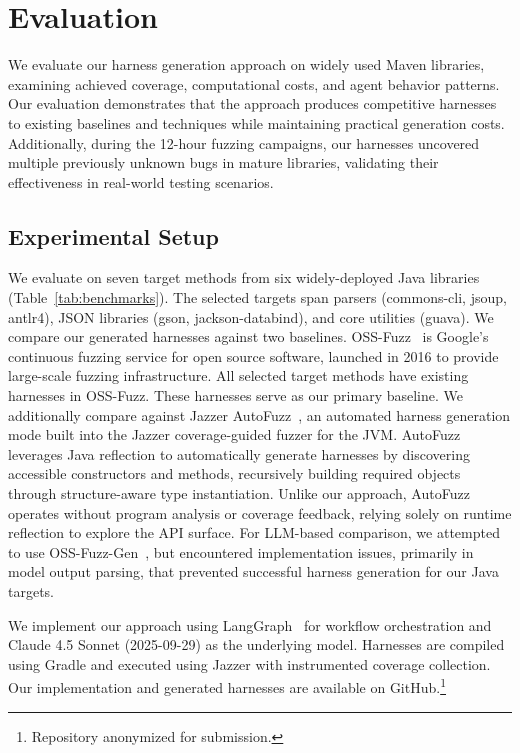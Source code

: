 \section{Evaluation}%
\label{sec:evaluation}

We evaluate our harness generation approach on widely used Maven libraries, examining achieved coverage, computational costs, and agent behavior patterns. Our evaluation demonstrates that the approach produces competitive harnesses to existing baselines and techniques while maintaining practical generation costs. Additionally, during the 12-hour fuzzing campaigns, our harnesses uncovered multiple previously unknown bugs in mature libraries, validating their effectiveness in real-world testing scenarios.

\subsection{Experimental Setup}%
\label{subsec:exp-setup}

We evaluate on seven target methods from six widely-deployed Java libraries (Table~\ref{tab:benchmarks}). The selected targets span parsers (commons-cli, jsoup, antlr4), JSON libraries (gson, jackson-databind), and core utilities (guava).
%
We compare our generated harnesses against two baselines. OSS-Fuzz~\cite{ossfuzz2017} is Google's continuous fuzzing service for open source software, launched in 2016 to provide large-scale fuzzing infrastructure. All selected target methods have existing harnesses in OSS-Fuzz. These harnesses serve as our primary baseline.
%
We additionally compare against Jazzer AutoFuzz~\cite{jazzer}, an automated harness generation mode built into the Jazzer coverage-guided fuzzer for the JVM. AutoFuzz leverages Java reflection to automatically generate harnesses by discovering accessible constructors and methods, recursively building required objects through structure-aware type instantiation. Unlike our approach, AutoFuzz operates without program analysis or coverage feedback, relying solely on runtime reflection to explore the API surface.
%
For LLM-based comparison, we attempted to use OSS-Fuzz-Gen~\cite{oss-fuzz-gen}, but encountered implementation issues, primarily in model output parsing, that prevented successful harness generation for our Java targets.
\par
We implement our approach using LangGraph~\cite{langgraph} for workflow orchestration and Claude 4.5 Sonnet (2025-09-29) as the underlying model. Harnesses are compiled using Gradle and executed using Jazzer with instrumented coverage collection. Our implementation and generated harnesses are available on GitHub.\footnote{Repository anonymized for submission.}
